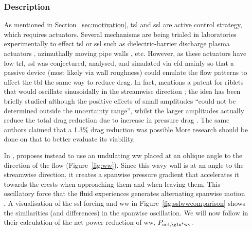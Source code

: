 \subsubsection{Description}
As mentioned in Section~\ref{sec:motivation}, \gls{tsl} and \gls{ssl} are active control strategy, which requires actuators. Several mechanisms are being trialed in laboratories experimentally to effect \gls{tsl} or \gls{ssl} such as dielectric-barrier discharge plasma actuators \cite{choi2011}, azimuthally moving pipe walls \cite{auteri2010}, etc. However, as these actuators have low \gls{trl}, \gls{ssl} was conjectured, analysed, and simulated via \gls{cfd} mainly so that a passive device (most likely via wall roughness) could emulate the flow patterns to affect the \gls{tbl} the same way to reduce drag. In fact, \textcite{viotti2009} mentions a patent for riblets that would oscillate sinusoidally in the streamwise direction \cite{quadrio2008}; the idea has been briefly studied although the positive effects of small amplitudes ``could not be determined outside the uncertainty range'', whilst the larger amplitudes actually reduce the total drag reduction due to increase in pressure drag \cite{kramer2010}. The same authors claimed that a 1.3\% drag reduction was possible \cite{gruneberger2012}  More research should be done on that to better evaluate its viability.

In \cite{chernyshenko2013}, \citeauthor{chernyshenko2013} proposes instead to use an undulating \gls{ww} placed at an oblique angle to the direction of the flow (Figure~\ref{fig:ww}). Since this wavy wall is at an angle to the streamwise direction, it creates a spanwise pressure gradient that accelerates it towards the crests when approaching them and when leaving them. This oscillatory force that the fluid experiences generates alternating spanwise motion \cite{ghebali2017}. A visualisation of the \gls{ssl} forcing and \gls{ww} in Figure~\ref{fig:sslwwcomparison} shows the similarities (and differences) in the spanwise oscillation. We will now follow \textcite{chernyshenko2013} in their calculation of the net power reduction of \gls{ww}, $P_\text{net,\gls*{wv}} $.

